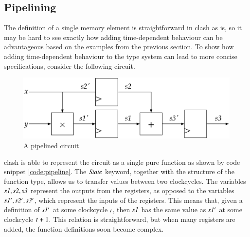 \subsection{Pipelining}
The definition of a single memory element is straightforward in \gls{clash} as is, so it may be hard to see exactly how adding time-dependent behaviour can be advantageous based on the examples from the previous section.
To show how adding time-dependent behaviour to the type system can lead to more concise specifications, consider the following circuit.

\begin{figure}[H]
\begin{center}
\centering
\includegraphics[width=\textwidth]{images/pipeline}
\end{center}
\caption{A pipelined circuit} \label{fig:pipeline}
\end{figure}

\gls{clash} is able to represent the circuit as a single pure function as shown by code snippet \ref{code:pipeline}.
The \ensuremath{\Conid{State}} keyword, together with the structure of the function type, allows us to transfer values between two clockcycles.
The variables \ensuremath{\Varid{s1},\Varid{s2},\Varid{s3}} represent the outputs from the registers, as opposed to the variables \ensuremath{\Varid{s1'},\Varid{s2'},\Varid{s3'}}, which represent the inputs of the registers.
This means that, given a definition of \ensuremath{\Varid{s1'}} at some clockcycle \ensuremath{\Varid{t}}, then \ensuremath{\Varid{s1}} has the same value as \ensuremath{\Varid{s1'}} at some clockcycle \ensuremath{\Varid{t}\mathbin{+}\mathrm{1}}.
This relation is straightforward, but when many registers are added, the function definitions soon become complex. 

